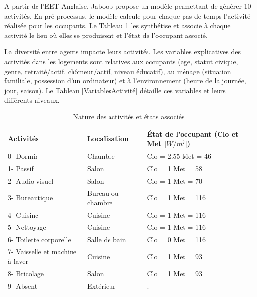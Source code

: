 A partir de l'EET Anglaise, Jaboob \cite{Jaboob-16} propose un modèle permettant de générer 10 activités. En pré-processus, le modèle calcule pour chaque pas de temps l'activité réalisée pour les occupants. Le Tableau \ref{tab:Activités} les synthétise et associe à chaque activité le lieu où elles se produisent et l'état de l'occupant associé.

La diversité entre agents impacte leurs activités. Les variables explicatives des activités dans les logements sont relatives aux occupants (age, statut civique, genre, retraité/actif, chômeur/actif, niveau éducatif), au ménage (situation familiale, possession d'un ordinateur) et à l'environnement (heure de la journée, jour, saison). Le Tableau \ref{VariablesActivité} détaille ces variables et leurs différents niveaux.

\begin{table} [H]
\centering
\begin{tabular}{|p{5 cm}||p{5 cm}|p{5 cm}|}
\hline Activités & Localisation & État de l'occupant (Clo et Met [$W/m^{2}$]) \\
\hline
\hline 0- Dormir & Chambre & Clo = 2.55 \newline Met = 46 \\
\hline 1- Passif & Salon & Clo = 1 \newline Met = 58 \\
\hline 2- Audio-visuel & Salon & Clo = 1 \newline Met = 70 \\
\hline 3- Bureautique & Bureau ou chambre & Clo = 1 \newline Met = 116 \\
\hline 4- Cuisine & Cuisine & Clo = 1 \newline Met = 116 \\
\hline 5- Nettoyage & Cuisine & Clo = 1 \newline Met = 116 \\
\hline 6- Toilette corporelle & Salle de bain & Clo = 0 \newline Met = 116 \\
\hline 7- Vaisselle et machine à laver & Cuisine & Clo = 1 \newline Met = 93 \\
\hline 8- Bricolage & Salon & Clo = 1 \newline Met = 93 \\
\hline 9- Absent & Extérieur & .  \\
\hline
\end{tabular}
\normalsize
\caption{Nature des activités et états associés}
\label{tab:Activités}
\end{table}

